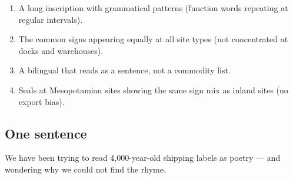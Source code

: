 \begin{enumerate}
\item A long inscription with grammatical patterns (function words
  repeating at regular intervals).
\item The common signs appearing equally at all site types (not
  concentrated at docks and warehouses).
\item A bilingual that reads as a sentence, not a commodity list.
\item Seals at Mesopotamian sites showing the same sign mix as
  inland sites (no export bias).
\end{enumerate}

\subsection{One sentence}

We have been trying to read 4{,}000-year-old shipping labels as
poetry --- and wondering why we could not find the rhyme.


